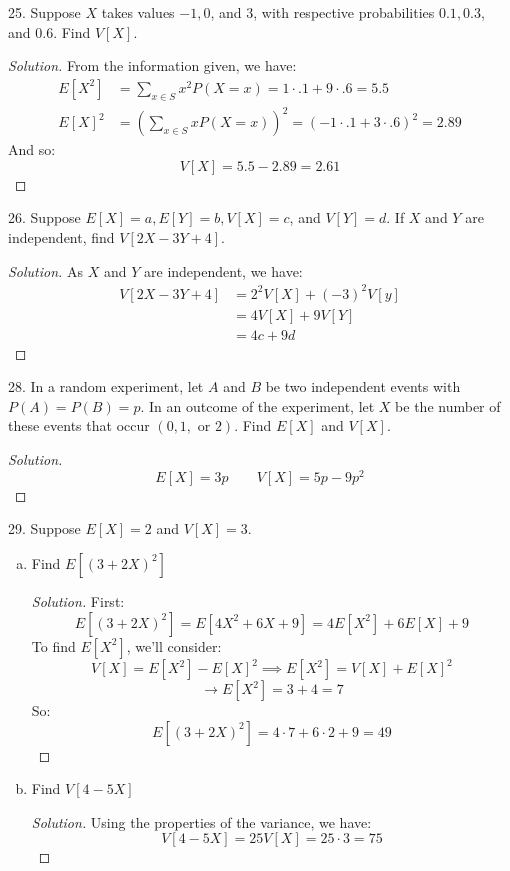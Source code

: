 \documentclass{article}
\newcommand{\be}{\begin{enumerate}}
\newcommand{\ee}{\end{enumerate}}
\begin{document}
	\item[25.] Suppose $X$ takes values $-1, 0$, and $3$, with respective probabilities $0.1, 0.3$,
and $0.6$. Find $V [X]$.
\begin{proof}[Solution]
From the information given, we have:
\begin{align*}
E[X^2] &= \sum_{x\in S}x^2P(X=x) = 1\cdot.1 + 9\cdot.6 = 5.5\\
E[X]^2 &= \left(\sum_{x\in S}xP(X=x)\right)^2 = \left(-1\cdot.1 + 3\cdot.6\right)^2 = 2.89
\end{align*}
And so:
$$V[X] = 5.5 - 2.89 = 2.61$$
\end{proof}
	
	\item[26.] Suppose $E[X] = a, E[Y] = b, V [X] = c$, and $V [Y] = d$. If $X$ and $Y$ are
independent, find $V [2X - 3Y + 4]$.
\begin{proof}[Solution]
As $X$ and $Y$ are independent, we have:
\begin{align*}
V[2X - 3Y + 4] &= 2^2V[X] + (-3)^2V[y]\\
&= 4V[X] + 9V[Y]\\
&= 4c + 9d
\end{align*}
\end{proof}
	
	\item[28.] In a random experiment, let $A$ and $B$ be two independent events with $P(A) =
P(B) = p$. In an outcome of the experiment, let $X$ be the number of these
events that occur $(0, 1, \text{ or } 2)$. Find $E[X]$ and $V [X]$.
	\begin{proof}[Solution]
	$$E[X] = 3p\qquad V[X] = 5p-9p^2$$
	\end{proof}
	\item[29.] Suppose $E[X] = 2$ and $V [X] = 3$.
	\be[(a)]
		\item Find $E[(3 + 2X)^2]$
		\begin{proof}[Solution]
		First:
		$$E[(3 + 2X)^2] = E[4X^2 + 6X + 9] = 4E[X^2] + 6E[X] + 9$$
		To find $E[X^2]$, we'll consider:
		$$V[X] = E[X^2] - E[X]^2 \implies E[X^2] = V[X] + E[X]^2$$
		$$\to E[X^2] = 3 + 4 = 7$$
		So:
		$$E[(3 + 2X)^2] = 4\cdot7 + 6\cdot2 + 9 = 49$$
		\end{proof}
		\item Find $V [4 - 5X]$
		\begin{proof}[Solution]
		Using the properties of the variance, we have:
		$$V [4 - 5X] = 25V[X] = 25\cdot3 = 75$$
		\end{proof}
	\ee
\end{document}

